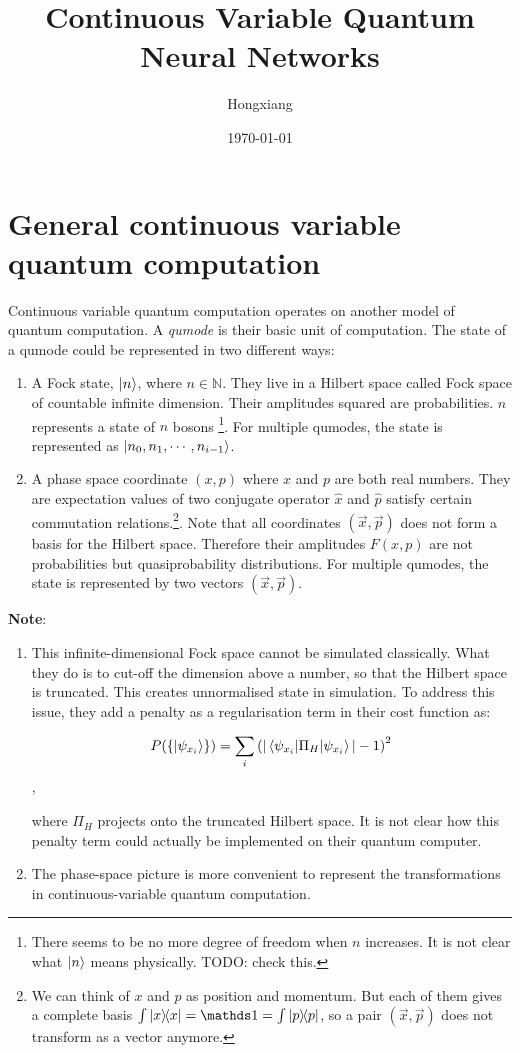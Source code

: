 \documentclass{article}
\title{Continuous Variable Quantum Neural Networks}
\date{\today}
\author{Hongxiang}
\begin{document}
\maketitle
{}
\tableofcontents

\section{General continuous variable quantum computation}

Continuous variable quantum computation operates on another model of quantum
computation. A \textit{qumode} is their basic unit of computation. The state of
a qumode could be represented in two different ways:
\begin{enumerate}
  \item A Fock state, $\ket{n}$, where $n\in \mathbb{N}$. They live in a Hilbert
    space called Fock space of countable infinite dimension. Their amplitudes
    squared are probabilities. $n$ represents a state of $n$ bosons
    \footnote{There seems to be no more degree of freedom when $n$ increases. It
    is not clear what $\ket{n}$ means physically. TODO: check this.}. For
    multiple qumodes, the state is represented as
    $\ket{n_0,n_1,\cdots,n_{i-1}}$.
  \item A phase space coordinate $(x,p)$ where $x$ and $p$ are both real
    numbers. They are expectation values of two conjugate operator $\hat{x}$ and
    $\hat{p}$ satisfy certain commutation relations.\footnote{We can think of
      $x$ and $p$ as position and momentum. But each of them gives a complete
      basis $\int \ketbra{x} = \id = \int \ketbra{p}$, so a pair
      $(\vec{x},\vec{p})$ does not transform as a vector anymore.
    }. Note that all coordinates $(\vec{x},\vec{p})$ does not form a
    basis for the Hilbert space. Therefore their amplitudes $F(x,p)$ are not
    probabilities but quasiprobability distributions. For multiple qumodes, the
    state is represented by two vectors $(\vec{x}, \vec{p})$.
\end{enumerate}

\textbf{Note}: 
\begin{enumerate}
  \item This infinite-dimensional Fock space cannot be simulated classically.
    What they do is to cut-off the dimension above a number, so that the Hilbert
    space is truncated. This creates unnormalised state in simulation. To
    address this issue, they add a penalty as a regularisation term in their
    cost function as:

    $$
    P(\{\ket{\psi_{x_i}}\}) = 
    \sum_i \left( |\braket{\psi_{x_i} | \Pi_H | \psi_{x_i}}| - 1\right)^2
    $$,

    where $\Pi_H$ projects onto the truncated Hilbert space. It is not clear how
    this penalty term could actually be implemented on their quantum computer.
  \item The phase-space picture is more convenient to represent the
    transformations in continuous-variable quantum computation.
\end{enumerate}
\end{document}
